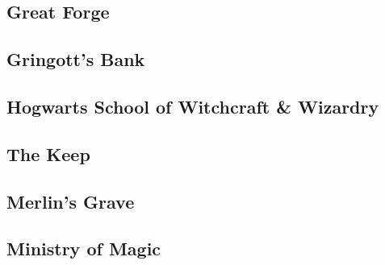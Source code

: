 \documentclass[oneside]{book}
\begin{document}
\subsection{Great Forge}
\subsection{Gringott's Bank}
\subsection{Hogwarts School of Witchcraft \& Wizardry}
\subsection{The Keep}
\subsection{Merlin's Grave}
\subsection{Ministry of Magic}
\end{document}
